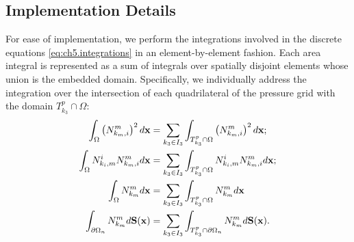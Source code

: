 \subsection{Implementation Details} \label{subsec:ch5.implementation}

For ease of implementation, we perform the integrations involved in the discrete equations \eqref{eq:ch5.integrations} in an element-by-element fashion. Each area integral is represented as a sum of integrals over spatially disjoint elements whose union is the embedded domain. Specifically, we individually address the integration over the intersection of each quadrilateral of the pressure grid with the domain $T^p_{k_3} \cap \Omega$:
\begin{align*}
\int_{\Omega} \left( N^m_{k_m,i} \right)^2 d\mathbf{x} & = \sum_{k_3 \in I_3} \int_{T^p_{k_3} \cap \Omega} \left( N^m_{k_m,i} \right)^2 d\mathbf{x}; \\
\int_{\Omega} N^i_{k_i,m} N^m_{k_m,i} d\mathbf{x} & = \sum_{k_3 \in I_3} \int_{T^p_{k_3} \cap \Omega} N^i_{k_i,m} N^m_{k_m,i} d\mathbf{x}; \\
\int_{\Omega} N^m_{k_m} d\mathbf{x} & = \sum_{k_3 \in I_3} \int_{T^p_{k_3} \cap \Omega} N^m_{k_m} d\mathbf{x} \\
\int_{\partial\Omega_n} N^m_{k_m} d\mathbf{S}(\mathbf{x}) & = \sum_{k_3 \in I_3} \int_{T^p_{k_3} \cap \partial\Omega_n} N^m_{k_m} d\mathbf{S}(\mathbf{x}).
\end{align*}
